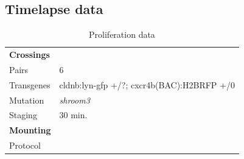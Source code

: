 \documentclass[11pt,singlespacinge,twoside]{reedthesis} %
\begin{document}
\hypertarget{tl-data}{%
\subsection{Timelapse data}\label{tl-data}}
\begin{longtable}[]{@{}ll@{}}
\caption{\label{tab:prolifdata} Proliferation data}\tabularnewline
\toprule
\endhead
\begin{minipage}[t]{0.21\columnwidth}\raggedright
\textbf{Crossings}\strut
\end{minipage} & \begin{minipage}[t]{0.73\columnwidth}\raggedright
\strut
\end{minipage}\tabularnewline
\begin{minipage}[t]{0.21\columnwidth}\raggedright
Pairs\strut
\end{minipage} & \begin{minipage}[t]{0.73\columnwidth}\raggedright
6\strut
\end{minipage}\tabularnewline
\begin{minipage}[t]{0.21\columnwidth}\raggedright
Transgenes\strut
\end{minipage} & \begin{minipage}[t]{0.73\columnwidth}\raggedright
cldnb:lyn-gfp +/?; cxcr4b(BAC):H2BRFP +/0\strut
\end{minipage}\tabularnewline
\begin{minipage}[t]{0.21\columnwidth}\raggedright
Mutation\strut
\end{minipage} & \begin{minipage}[t]{0.73\columnwidth}\raggedright
\emph{shroom3}\strut
\end{minipage}\tabularnewline
\begin{minipage}[t]{0.21\columnwidth}\raggedright
Staging\strut
\end{minipage} & \begin{minipage}[t]{0.73\columnwidth}\raggedright
30 min.\strut
\end{minipage}\tabularnewline
\begin{minipage}[t]{0.21\columnwidth}\raggedright
\textbf{Mounting}\strut
\end{minipage} & \begin{minipage}[t]{0.73\columnwidth}\raggedright
\strut
\end{minipage}\tabularnewline
\begin{minipage}[t]{0.21\columnwidth}\raggedright
Protocol\strut
\end{minipage} & \begin{minipage}[t]{0.73\columnwidth}\raggedright

\end{minipage}
\end{longtable}
\end{document}
